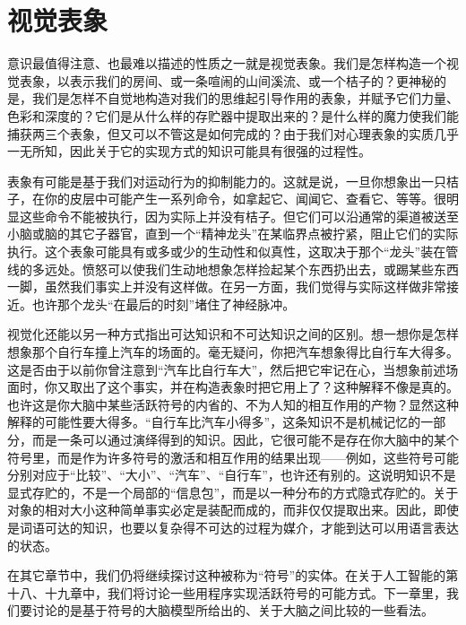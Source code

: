 \section{视觉表象}

意识最值得注意、也最难以描述的性质之一就是视觉表象。我们是怎样构造一个视觉表象，以表示我们的房间、或一条喧闹的山间溪流、或一个桔子的？更神秘的是，我们是怎样不自觉地构造对我们的思维起引导作用的表象，并赋予它们力量、色彩和深度的？它们是从什么样的存贮器中提取出来的？是什么样的魔力使我们能捕获两三个表象，但又可以不管这是如何完成的？由于我们对心理表象的实质几乎一无所知，因此关于它的实现方式的知识可能具有很强的过程性。

表象有可能是基于我们对运动行为的抑制能力的。这就是说，一旦你想象出一只桔子，在你的皮层中可能产生一系列命令，如拿起它、闻闻它、查看它、等等。很明显这些命令不能被执行，因为实际上并没有桔子。但它们可以沿通常的渠道被送至小脑或脑的其它子器官，直到一个“精神龙头”在某临界点被拧紧，阻止它们的实际执行。这个表象可能具有或多或少的生动性和似真性，这取决于那个“龙头”装在管线的多远处。愤怒可以使我们生动地想象怎样捡起某个东西扔出去，或踢某些东西一脚，虽然我们事实上并没有这样做。在另一方面，我们觉得与实际这样做非常接近。也许那个龙头“在最后的时刻”堵住了神经脉冲。

视觉化还能以另一种方式指出可达知识和不可达知识之间的区别。想一想你是怎样想象那个自行车撞上汽车的场面的。毫无疑问，你把汽车想象得比自行车大得多。这是否由于以前你曾注意到“汽车比自行车大”，然后把它牢记在心，当想象前述场面时，你又取出了这个事实，并在构造表象时把它用上了？这种解释不像是真的。也许这是你大脑中某些活跃符号的内省的、不为人知的相互作用的产物？显然这种解释的可能性要大得多。“自行车比汽车小得多”，这条知识不是机械记忆的一部分，而是一条可以通过演绎得到的知识。因此，它很可能不是存在你大脑中的某个符号里，而是作为许多符号的激活和相互作用的结果出现——例如，这些符号可能分别对应于“比较”、“大小”、“汽车”、“自行车”，也许还有别的。这说明知识不是显式存贮的，不是一个局部的“信息包”，而是以一种分布的方式隐式存贮的。关于对象的相对大小这种简单事实必定是装配而成的，而非仅仅提取出来。因此，即使是词语可达的知识，也要以复杂得不可达的过程为媒介，才能到达可以用语言表达的状态。

在其它章节中，我们仍将继续探讨这种被称为“符号”的实体。在关于人工智能的第十八、十九章中，我们将讨论一些用程序实现活跃符号的可能方式。下一章里，我们要讨论的是基于符号的大脑模型所给出的、关于大脑之间比较的一些看法。


